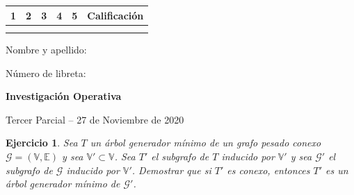 \documentclass[a4paper,oneside,12pt]{amsart}
\newcommand{\nombremateria}
{Investigaci\'on Operativa}
\newcommand{\numeroparcial}
    { Tercer Parcial }
\newcommand{\fecha}
    {27 de Noviembre de 2020}
\newtheorem{quest}{Ejercicio}
\begin{document}
\hfill \hfill
\begin{tabular}[c]{|c|c|c|c|c|c|}
\hline 
1 & 2 & 3 & 4 & 5 & Calificaci\'on \\ \hline \hline
\hspace{1 cm} & \hspace{1 cm} & \hspace{1 cm} & \hspace{1 cm} & \hspace{1 cm} & \hspace{1.3 cm} \\
\hspace{1 cm} & \hspace{1  cm} & \hspace{1  cm} & \hspace{1  cm} & \hspace{1  cm} & \hspace{1.3 cm} \\ \hline

\end{tabular}

\vspace{-1cm}

\noindent Nombre y apellido:

\vspace{0.2cm}

\noindent Número de libreta:

\noindent \hrulefill 

\smallskip
\renewcommand{\baselinestretch}{1.1}

\begin{center}
	\large \textbf{\nombremateria} 
	
	\numeroparcial -- \fecha
\end{center}

\vspace{.6cm}
\renewcommand{\theenumi}{\textbf{\arabic{enumi}}}


\begin{quest} 
Sea $T$ un árbol generador mínimo de un grafo pesado conexo $\mathcal{G}=(\mathbb{V}, \mathbb{E})$ y sea $\mathbb{V}'\subset \mathbb{V}$. Sea $T'$ el subgrafo de $T$ inducido por $\mathbb{V}'$ y sea $\mathcal{G}'$ el subgrafo de $\mathcal{G}$ inducido por $\mathbb{V}'$. Demostrar que si $T'$ es conexo, entonces $T'$ es un árbol generador mínimo de $\mathcal{G}'$.
\end{quest}
\end{document}
